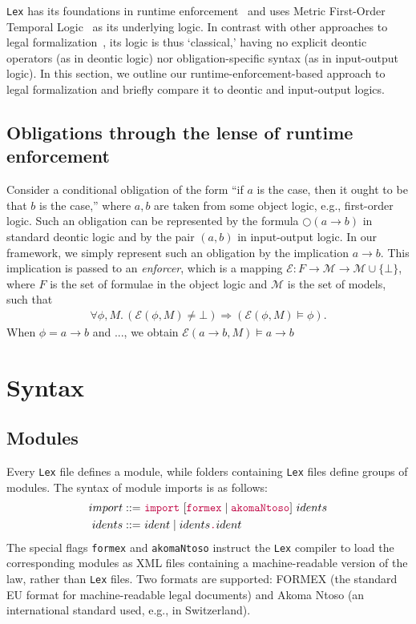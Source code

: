 \documentclass[runningheads]{llncs}
\newcommand{\Lex}{\texttt{Lex}}
\newcommand{\kw}[1]{{\color{purple}\texttt{#1}}}
\newcommand{\Oblig}{\Circle}
\newcommand{\Epsilon}{\mathcal{E}}
\newcommand{\Models}{\mathcal{M}}
\begin{document}
\Lex{} has its foundations in runtime enforcement~\cite{Schneider2000} and uses
Metric First-Order Temporal Logic~\cite{Chomicki1995,Basin2015} as its underlying logic.
In contrast with other approaches to legal formalization~\cite{...}, its logic is thus `classical,'
having no explicit deontic operators (as in deontic logic) nor obligation-specific syntax
(as in input-output logic). In this section, we outline our runtime-enforcement-based
approach to legal formalization and briefly compare it to deontic and input-output logics.

\subsection{Obligations through the lense of runtime enforcement}

Consider a conditional obligation of the form ``if $a$ is the case, then it ought to be that $b$ is the case,'' where $a,b$ are taken from some object logic, e.g., first-order logic.
Such an obligation can be represented by the formula $\Oblig(a \rightarrow b)$ in standard deontic logic and
by the pair $(a,b)$ in input-output logic. In our framework, we simply represent such an
obligation by the implication $a \rightarrow b$. This implication is passed to an \emph{enforcer},
which is a mapping
$\Epsilon: F \rightarrow \Models \rightarrow \Models \cup \lbrace \bot\rbrace $, where $F$ is the set of formulae in the
object logic and $\Models$ is the set of models, such that
\begin{align*}
  \forall \phi, M.\,(\Epsilon(\phi, M) \neq \bot) \Rightarrow (\Epsilon(\phi,M) \models \phi).
\end{align*}
 When $\phi = a \rightarrow b$ and ..., we obtain $\Epsilon(a \rightarrow b, M) \models a \rightarrow b$

 \fi
\section{Syntax}

\subsection{Modules}

Every \Lex{} file defines a module, while folders containing \Lex{} files define groups of modules. The syntax of module imports is as follows:
\begin{align*}
  import ::=&~\kw{import}~[\kw{formex} \mid \kw{akomaNtoso}]~idents\\
  idents ::=&~ ident \mid idents\kw{.}ident
\end{align*}
The special flags \kw{formex} and \kw{akomaNtoso} instruct the \Lex{} compiler to load the
corresponding modules as XML files containing a machine-readable version of the law, rather than
\Lex{} files. Two formats are supported: FORMEX (the standard EU format for machine-readable
legal documents) and Akoma Ntoso (an international standard used, e.g., in Switzerland).
\end{document}
